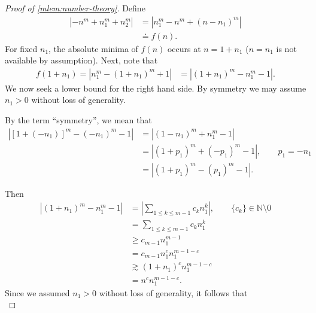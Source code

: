 \begin{proof}[Proof of \cref{mlem:number-theory}] Define
%
\begin{equation*}
	\begin{split}
		| - n^{m} + n_1^{m} + n_2^{m }|
		& = | n_{1}^{m} - n^{m} + (n-n_{1})^{m}| 
		\\
		& \doteq f(n).
	\end{split}
\end{equation*}
%
%
For fixed $n_1$, the absolute minima
of $f(n)$ occurs at $n = 1+n_{1}$ ($n = n_1$ is not available by assumption). Next, note that
%
%
\begin{equation*}
	\begin{split}
		f(1+ n_{1}) = | n_{1}^{m} - (1 + n_{1})^m + 1 |
		& = | (1 + n_{1} )^{m} - n_{1}^{m} -1 |.
	\end{split}
\end{equation*}
We now seek a lower bound for the right hand side. By symmetry we may assume
$n_1 >0$ without loss of generality.
%
%
\begin{framed}
\begin{remark}
	By the term ``symmetry'', we mean that
	\begin{equation*}
	\begin{split}
	| [1 + (-n_1)]^m - (-n_1)^m -1 |
	& = | (1 - n_1)^m + n_1^m -1 |
	\\
	& = | (1 + p_1)^m + (-p_1)^m -1 |, \qquad p_1 = -n_1
	\\
	& = | (1 + p_1)^m - (p_1)^m -1 |.
	\end{split}
\end{equation*}
%
%
\end{remark}
\end{framed}
%
%
Then 
%
%
\begin{equation*}
	\begin{split}
	| (1 + n_{1} )^{m} - n_{1}^{m} -1 |
	& = | \sum_{1 \le k \le m-1} c_{k} n_1^{k}|, \qquad \{c_k\} \in
	\mathbb{N}\setminus 0
	 \\
	 & = \sum_{1 \le k \le m-1} c_{k} n_1^{k}
	 \\
	 & \ge c_{m-1}  n_1^{m-1}
	 \\
	 & = c_{m-1}  n_1^{c} n_1^{m-1-c}
	 \\
	 & \gtrsim (1 + n_1)^{c}  n_1^{m-1-c}
	 \\
	 & = n^{c} n_1^{m-1-c}. 
 \end{split}
\end{equation*}
%
%
Since we assumed $n_1 >0$ without loss of generality, it follows that 
%
%
\begin{equation*}

\end{equation*}
\end{proof}
